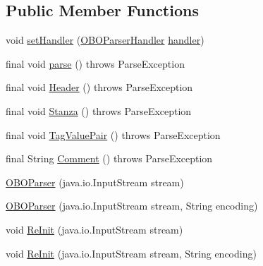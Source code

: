\subsection*{Public Member Functions}
\begin{DoxyCompactItemize}
\item 
void \hyperlink{classorg_1_1coode_1_1owlapi_1_1obo_1_1parser_1_1_o_b_o_parser_a234b78d9332b696dc3488c27716446c4}{set\-Handler} (\hyperlink{interfaceorg_1_1coode_1_1owlapi_1_1obo_1_1parser_1_1_o_b_o_parser_handler}{O\-B\-O\-Parser\-Handler} \hyperlink{classorg_1_1coode_1_1owlapi_1_1obo_1_1parser_1_1_o_b_o_parser_a7ce0c0b2026ce6ae3bf0362e878ca160}{handler})
\item 
final void \hyperlink{classorg_1_1coode_1_1owlapi_1_1obo_1_1parser_1_1_o_b_o_parser_ad532d5b0e73afe486f0393b36b85d544}{parse} ()  throws Parse\-Exception 
\item 
final void \hyperlink{classorg_1_1coode_1_1owlapi_1_1obo_1_1parser_1_1_o_b_o_parser_a5e61ea414d2eafd82fb55731f4bf939c}{Header} ()  throws Parse\-Exception 
\item 
final void \hyperlink{classorg_1_1coode_1_1owlapi_1_1obo_1_1parser_1_1_o_b_o_parser_a6c43f3f20d4d93d4dca8ab8e18d12e72}{Stanza} ()  throws Parse\-Exception 
\item 
final void \hyperlink{classorg_1_1coode_1_1owlapi_1_1obo_1_1parser_1_1_o_b_o_parser_ad132f94223c5cb4c87800ca943b8c60c}{Tag\-Value\-Pair} ()  throws Parse\-Exception 
\item 
final String \hyperlink{classorg_1_1coode_1_1owlapi_1_1obo_1_1parser_1_1_o_b_o_parser_ab954f9ecb5146bc392a6eae043851150}{Comment} ()  throws Parse\-Exception 
\item 
\hyperlink{classorg_1_1coode_1_1owlapi_1_1obo_1_1parser_1_1_o_b_o_parser_a17fe73bc79fe5d850bf8620f84e91abb}{O\-B\-O\-Parser} (java.\-io.\-Input\-Stream stream)
\item 
\hyperlink{classorg_1_1coode_1_1owlapi_1_1obo_1_1parser_1_1_o_b_o_parser_ac529a5964355b821fe569317b125853f}{O\-B\-O\-Parser} (java.\-io.\-Input\-Stream stream, String encoding)
\item 
void \hyperlink{classorg_1_1coode_1_1owlapi_1_1obo_1_1parser_1_1_o_b_o_parser_aae7a58c26152aa05bdbccd00c20e6ecc}{Re\-Init} (java.\-io.\-Input\-Stream stream)
\item 
void \hyperlink{classorg_1_1coode_1_1owlapi_1_1obo_1_1parser_1_1_o_b_o_parser_a2ce5d5141134b6cce7eb724ecf99f1a3}{Re\-Init} (java.\-io.\-Input\-Stream stream, String encoding)
\item 

\end{DoxyCompactItemize}
